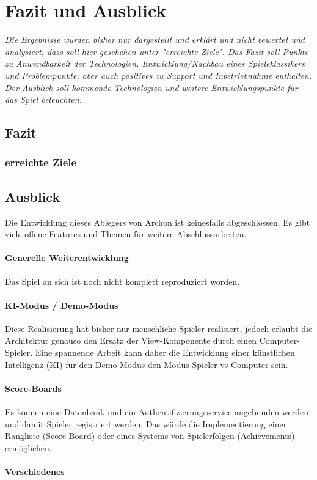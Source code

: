 
\chapter{Fazit und Ausblick}
\label{cha:fazit}

\emph{Die Ergebnisse wurden bisher nur dargestellt und erklärt und nicht bewertet und analysiert, dass soll hier geschehen unter "erreichte Ziele". Das Fazit soll Punkte zu Anwendbarkeit der Technologien, Entwicklung/Nachbau eines Spieleklassikers und Problempunkte, aber auch positives zu Support und Inbetriebnahme enthalten. Der Ausblick soll kommende Technologien und weitere Entwicklungspunkte für das Spiel beleuchten.}

\section{Fazit}
\label{sec:Schlussfolgerung}

\subsection{erreichte Ziele}
\label{subsec:erreichte_ziele}

\section{Ausblick}
\label{sec:Ausblick}

Die Entwicklung dieses Ablegers von Archon ist keinesfalls abgeschlossen. Es gibt viele offene Features und Themen für weitere Abschlussarbeiten.

\subsubsection{Generelle Weiterentwicklung}

Das Spiel an sich ist noch nicht komplett reproduziert worden.

\subsubsection{KI-Modus / Demo-Modus}

Diese Realisierung hat bisher nur menschliche Spieler realisiert, jedoch erlaubt die Architektur genauso den Ersatz der View-Komponente durch einen Computer-Spieler. Eine spannende Arbeit kann daher die Entwicklung einer künstlichen Intelligenz (KI) für den Demo-Modus \bzw den Modus Spieler-vs-Computer sein.

\subsubsection{Score-Boards}

Es können eine Datenbank und ein Authentifizierungsservice angebunden werden und damit Spieler registriert werden. Das würde die Implementierung einer Rangliste (Score-Board) oder eines Systems von Spielerfolgen (Achievements) ermöglichen.

\subsubsection{Verschiedenes}